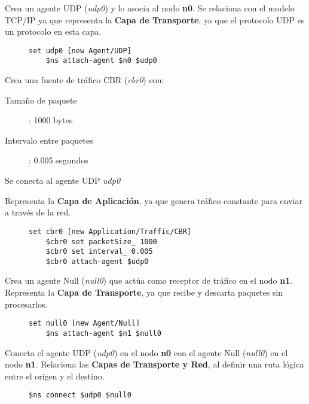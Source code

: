 \noindent Crea un agente UDP (\textit{udp0}) y lo asocia al nodo \textbf{n0}. Se relaciona con el modelo TCP/IP ya que representa la \textbf{Capa de Transporte}, 
ya que el protocolo UDP es un protocolo en esta capa.
\begin{figure}[H]
  \centering
  \begin{lstlisting}[frame=single, breaklines=true, basicstyle=\footnotesize\ttfamily, breakatwhitespace=false, 
    columns=flexible, tabsize=2, showstringspaces=false]
    set udp0 [new Agent/UDP]
    $ns attach-agent $n0 $udp0    
  \end{lstlisting}
\end{figure}

\newpage

\noindent Crea una  fuente de tr\'afico CBR (\textit{cbr0}) con:
\begin{description}
  \item[Tamaño de paquete] : 1000 bytes
  \item[Intervalo entre paquetes] : 0.005 segundos
  \item[Se conecta al agente UDP \textit{udp0}]  
\end{description}
Representa la \textbf{Capa de Aplicaci\'on}, ya que genera tr\'afico constante para enviar a trav\'es de la red.
\begin{figure}[H]
  \begin{lstlisting}[frame=single, breaklines=true, basicstyle=\footnotesize\ttfamily, breakatwhitespace=false, 
    columns=flexible, tabsize=2, showstringspaces=false]
    set cbr0 [new Application/Traffic/CBR]
    $cbr0 set packetSize_ 1000
    $cbr0 set interval_ 0.005
    $cbr0 attach-agent $udp0
  \end{lstlisting}
\end{figure}

\noindent Crea un agente Null (\textit{null0}) que act\'ua como receptor de tr\'afico en el nodo \textbf{n1}. Representa la \textbf{Capa de Transporte}, ya
que recibe y descarta paquetes sin procesarlos.
\begin{figure}[H]
  \begin{lstlisting}[frame=single, breaklines=true, basicstyle=\footnotesize\ttfamily, breakatwhitespace=false, 
    columns=flexible, tabsize=2, showstringspaces=false]
    set null0 [new Agent/Null]
    $ns attach-agent $n1 $null0    
  \end{lstlisting}
\end{figure}

\noindent Conecta el agente UDP (\textit{udp0}) en el nodo \textbf{n0} con el agente Null (\textit{null0}) en el nodo \textbf{n1}. Relaciona las 
\textbf{Capas de Transporte y Red}, al definir una ruta l\'ogica entre el origen y el destino.
\begin{figure}[H]
  \begin{lstlisting}[frame=single, breaklines=true, basicstyle=\footnotesize\ttfamily, breakatwhitespace=false, 
    columns=flexible, tabsize=2, showstringspaces=false]
    $ns connect $udp0 $null0
  \end{lstlisting}
\end{figure}

